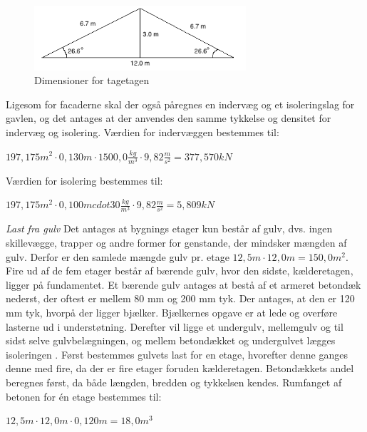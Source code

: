 \begin{figure}[htbp]
	\centering
	\includegraphics[width=0.7\textwidth]{billeder/Tagmedvinkel.png}
	\caption{Dimensioner for tagetagen}
	\label{fig:tagetage}
\end{figure}

Ligesom for facaderne skal der også påregnes en indervæg og et isoleringslag for gavlen, og det antages at der anvendes den samme tykkelse og densitet for indervæg og isolering.
\newline
\newline
Værdien for indervæggen bestemmes til:
\begin{center}
	$197,\!175 m^2\cdot 0,\!130 m\cdot 1500,\!0 \frac{kg}{m^3}\cdot 9,\!82 \frac{m}{s^2}=377,\!570 kN$
\end{center}

Værdien for isolering bestemmes til:
\begin{center}
	$197,\!175 m^2\cdot 0,\!100 mcdot 30 \frac{kg}{m^3}\cdot 9,\!82 \frac{m}{s^2}=5,\!809 kN$
\end{center}

\textit{Last fra gulv}
\newline
Det antages at bygnings etager kun består af gulv, dvs. ingen skillevægge, trapper og andre former for genstande, der mindsker mængden af gulv. Derfor er den samlede mængde gulv pr. etage $12,\!5 m\cdot 12,\!0 m=150,\!0 m^2$.
\newline \indent{     }  Fire ud af de fem etager består af bærende gulv, hvor den sidste, kælderetagen, ligger på fundamentet. Et bærende gulv antages at bestå af et armeret betondæk nederst, der oftest er mellem 80 mm og 200 mm tyk. Der antages, at den er 120 mm tyk, hvorpå der ligger bjælker. Bjælkernes opgave er at lede og overføre lasterne ud i understøtning. Derefter vil ligge et undergulv, mellemgulv og til sidst selve gulvbelægningen, og mellem betondækket og undergulvet lægges isoleringen \citep{Gulvopbygning}. 
\newline \indent{     }  Først bestemmes gulvets last for en etage, hvorefter denne ganges denne med fire, da der er fire etager foruden kælderetagen. Betondækkets andel beregnes først, da både længden, bredden og tykkelsen kendes. 
\newline
\newline
Rumfanget af betonen for én etage bestemmes til:
\begin{center}
	$12,\!5 m\cdot 12,\!0 m\cdot 0,\!120 m=18,\!0 m^3$
\end{center}

